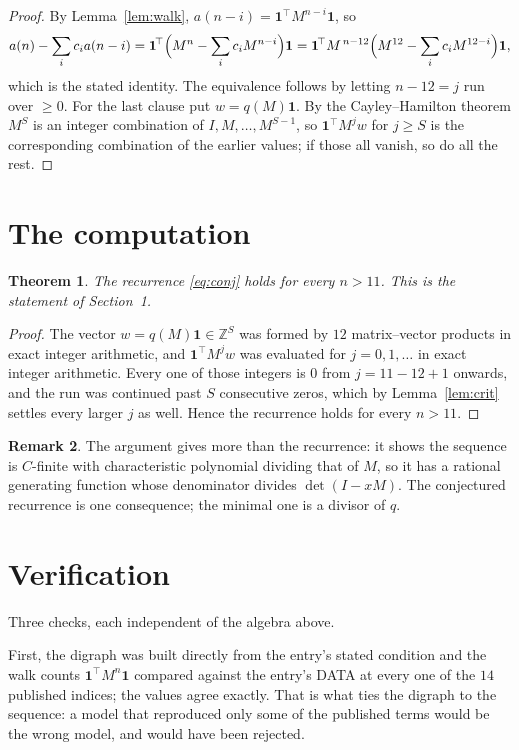 \documentclass[11pt,a4paper]{article}
\theoremstyle{plain}
\newtheorem{theorem}{Theorem}
\theoremstyle{definition}
\newtheorem{remark}[theorem]{Remark}
\begin{document}
\begin{proof}
By Lemma~\ref{lem:walk}, $a(n-i)=\mathbf{1}^{\!\top}M^{n-i}\mathbf{1}$, so
\[
a(n)-\sum_i c_i a(n-i)
=\mathbf{1}^{\!\top}\Bigl(M^{n}-\sum_i c_i M^{n-i}\Bigr)\mathbf{1}
=\mathbf{1}^{\!\top}M^{\,n-12}\Bigl(M^{12}-\sum_i c_i M^{12-i}\Bigr)\mathbf{1},
\]
which is the stated identity. The equivalence follows by letting $n-12=j$ run over
$\ge0$. For the last clause put $w=q(M)\mathbf{1}$. By the Cayley--Hamilton theorem
$M^{S}$ is an integer combination of $I,M,\dots,M^{S-1}$, so
$\mathbf{1}^{\!\top}M^{j}w$ for $j\ge S$ is the corresponding combination of the
earlier values; if those all vanish, so do all the rest.
\end{proof}

\section{The computation}

\begin{theorem}
The recurrence \eqref{eq:conj} holds for every $n>11$. This is the statement of
Section~1.
\end{theorem}

\begin{proof}
The vector $w=q(M)\mathbf{1}\in\mathbb{Z}^{S}$ was formed by $12$ matrix--vector
products in exact integer arithmetic, and $\mathbf{1}^{\!\top}M^{j}w$ was evaluated for
$j=0,1,\dots$ in exact integer arithmetic. Every one of those integers is $0$ from
$j=11-12+1$ onwards, and the run was continued past $S$ consecutive zeros, which by
Lemma~\ref{lem:crit} settles every larger $j$ as well. Hence the recurrence holds for
every $n>11$.
\end{proof}

\begin{remark}
The argument gives more than the recurrence: it shows the sequence is $C$-finite with
characteristic polynomial dividing that of $M$, so it has a rational generating function
whose denominator divides $\det(I-xM)$. The conjectured recurrence is one consequence; the
minimal one is a divisor of $q$.
\end{remark}

\section{Verification}

Three checks, each independent of the algebra above.

First, the digraph was built directly from the entry's stated condition and the walk counts
$\mathbf{1}^{\!\top}M^{n}\mathbf{1}$ compared against the entry's DATA at every one of
the $14$ published indices; the values agree exactly. That is what ties the digraph to
the sequence: a model that reproduced only some of the published terms would be the wrong
model, and would have been rejected.
\end{document}
